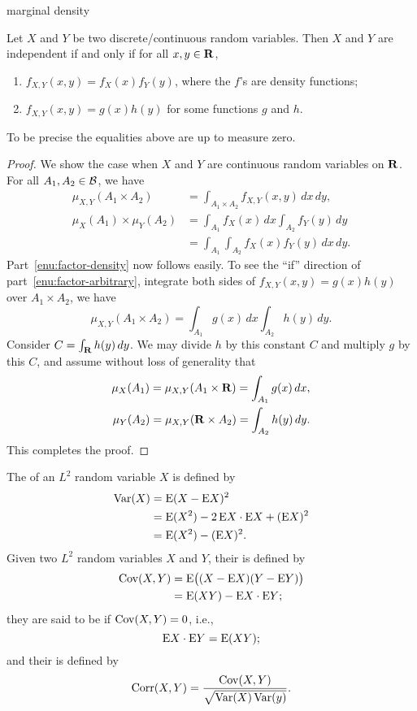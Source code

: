 marginal density
\begin{prop}[(Factorization)]
    Let $X$ and $Y$ be two discrete/continuous random variables. Then $X$ and $Y$ are independent if and only if for all $x,y\in \mathbf{R}$,
    \begin{enumerate}
        \item \label{enu:factor-density} $f_{X,Y}(x,y) = f_X(x)f_Y(y)$, where the $f$'s are density functions;
        \item \label{enu:factor-arbitrary} $f_{X,Y}(x,y) = g(x) h(y)$ for some functions $g$ and $h$.
    \end{enumerate} To be precise the equalities above are up to measure zero.
\end{prop}
\begin{proof}
    We show the case when $X$ and $Y$ are continuous random variables on $\mathbf{R}$. For all $A_1,A_2\in \mathcal{B}$, we have \begin{align*}
        \mu_{X,Y}(A_1 \times A_2) & = \int_{A_1 \times A_2} f_{X,Y}(x,y)\,dx\,dy, \\
        \mu_X(A_1) \times \mu_Y(A_2) & = \int_{A_1}f_X(x)\,dx \int_{A_2} f_Y(y)\,dy \\ & = \int_{A_1} \int_{A_2}f_X(x)f_Y(y)\,dx\,dy.
    \end{align*}
    Part~\ref{enu:factor-density} now follows easily. To see the ``if'' direction of part~\ref{enu:factor-arbitrary}, integrate both sides of $f_{X,Y}(x,y) = g(x) h(y)$ over $A_1 \times A_2$, we have \[
        \mu_{X,Y}(A_1 \times A_2) = \int_{A_1} g(x)\,dx \int_{A_2} h(y)\,dy.
    \] Consider $C = \int_{\mathbf{R}} h(y)\,dy$. We may divide $h$ by this constant $C$ and multiply $g$ by this $C$, and assume without loss of generality that \begin{align*}
        \mu_X(A_1) = \mu_{X,Y}(A_1\times \mathbf{R}) = \int_{A_1} g(x)\,dx, \\
        \mu_Y(A_2) = \mu_{X,Y}(\mathbf{R} \times A_2) = \int_{A_2} h(y)\,dy.
    \end{align*} This completes the proof.
\end{proof}

\begin{defn}
    The  of an $L^2$ random variable $X$ is defined by \begin{align*}
    \Var(X) & = \E(X - \E X)^2 \\
    & = \E (X^2) - 2 \E X\cdot \E X + (\E X)^2 \\
    & = \E(X^2) - (\E X)^2.
    \end{align*}
    Given two $L^2$ random variables $X$ and $Y$, their  is defined by\begin{align*}
        \operatorname{Cov}(X,Y) & = \mathop{}\!\mathrm{E}\bigl((X - \mathop{}\!\mathrm{E} X)(Y - \mathop{}\!\mathrm{E} Y)\bigr) \\
        & = \mathop{}\!\mathrm{E} (XY) - \mathop{}\!\mathrm{E} X \cdot \mathop{}\!\mathrm{E} Y;
    \end{align*} they are said to be  if $\operatorname{Cov}(X,Y) = 0$, i.e., 
    \[\mathop{}\!\mathrm{E} X \cdot \mathop{}\!\mathrm{E} Y = \mathop{}\!\mathrm{E}(XY);\] and their  is defined by \[
    	\operatorname{Corr}(X,Y) = \frac{\operatorname{Cov}(X,Y)}{\sqrt{\operatorname{Var}(X)\operatorname{Var}(y)}}.
    \]
    
\end{defn}

